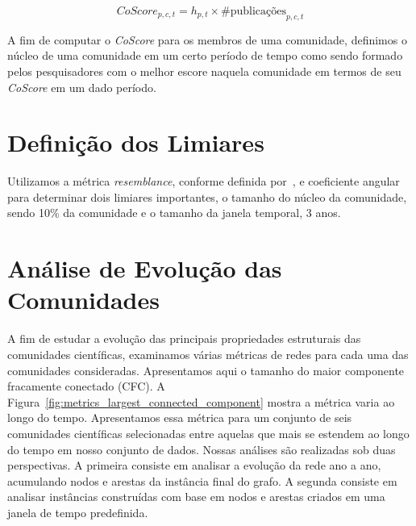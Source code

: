 \documentclass[12pt]{article}
\begin{document}
\begin{equation}
  \label{eq:core_score}
  \textit{CoScore}_{p,c,t} = h_{p,t} \times \textrm{\#}\text{publicações}_{p,c,t}
\end{equation}

A fim de computar o \textit{CoScore} para 
os membros de uma comunidade, definimos o núcleo de uma comunidade em um certo período de tempo 
como sendo formado pelos pesquisadores com o melhor escore naquela comunidade em termos de 
seu \textit{CoScore} em um dado período. 

\section{Definição dos Limiares}

Utilizamos a métrica \textit{resemblance}, conforme definida 
por~\cite{Viswanath2009}, e coeficiente angular para determinar dois limiares 
importantes, o tamanho do núcleo da comunidade, sendo 10\% da comunidade e 
o tamanho da janela temporal, 3 anos.

\section{Análise de Evolução das Comunidades}

A fim de estudar a evolução das principais propriedades estruturais das comunidades científicas, examinamos várias métricas 
de redes para cada uma das comunidades consideradas. Apresentamos aqui o tamanho do maior componente fracamente conectado 
(CFC). A Figura~\ref{fig:metrics_largest_connected_component}
mostra a métrica varia ao longo do tempo. Apresentamos essa métrica para um conjunto de seis 
comunidades científicas selecionadas entre aquelas que mais se estendem ao longo do tempo em nosso conjunto de dados.
Nossas análises são realizadas sob duas perspectivas. A primeira consiste em analisar a evolução da rede ano a ano, acumulando 
nodos e arestas da instância final do grafo. A segunda consiste em analisar instâncias construídas com base em nodos e 
arestas criados em uma janela de tempo predefinida.
\end{document}
